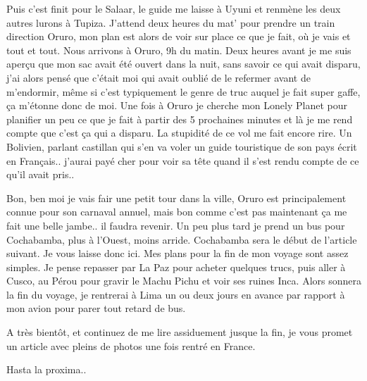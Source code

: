 \begin{multicols}{2}

Puis c'est finit pour le Salaar, le guide me laisse à Uyuni et renmène les deux autres lurons à Tupiza. J'attend deux heures du mat' pour prendre un train direction Oruro, mon plan est alors de voir sur place ce que je fait, où je vais et tout et tout. Nous arrivons à Oruro, 9h du matin. Deux heures avant je me suis aperçu que mon sac avait été ouvert dans la nuit, sans savoir ce qui avait disparu, j'ai alors pensé que c'était moi qui avait oublié de le refermer avant de m'endormir, même si c'est typiquement le genre de truc auquel je fait super gaffe, ça m'étonne donc de moi. Une fois à Oruro je cherche mon Lonely Planet pour planifier un peu ce que je fait à partir des 5 prochaines minutes et là je me rend compte que c'est ça qui a disparu. La stupidité de ce vol me fait encore rire. Un Bolivien, parlant castillan qui s'en va voler un guide touristique de son pays écrit en Français.. j'aurai payé cher pour voir sa tête quand il s'est rendu compte de ce qu'il avait pris..

Bon, ben moi je vais fair une petit tour dans la ville, Oruro est principalement connue pour son carnaval annuel, mais bon comme c'est pas maintenant ça me fait une belle jambe.. il faudra revenir. Un peu plus tard je prend un bus pour Cochabamba, plus à l'Ouest, moins arride. Cochabamba sera le début de l'article suivant. Je vous laisse donc ici. Mes plans pour la fin de mon voyage sont assez simples. Je pense repasser par La Paz pour acheter quelques trucs, puis aller à Cusco, au Pérou pour gravir le Machu Pichu et voir ses ruines Inca. Alors sonnera la fin du voyage, je rentrerai à Lima un ou deux jours en avance par rapport à mon avion pour parer tout retard de bus.

A très bientôt, et continuez de me lire assiduement jusque la fin, je vous promet un article avec pleins de photos une fois rentré en France.

Hasta la proxima..

\end{multicols}


